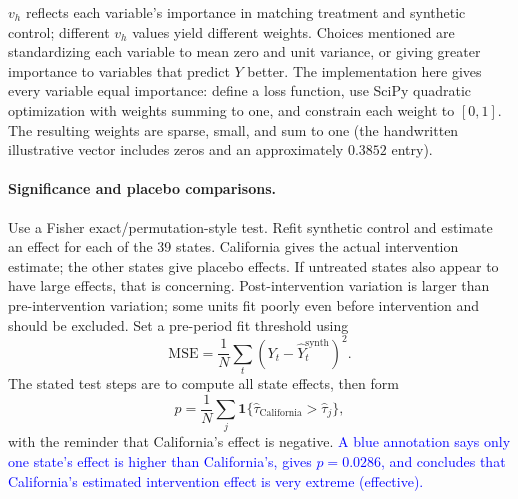 \documentclass[11pt,a4paper]{article}
\newcommand{\inkblue}[1]{\textcolor{blue}{#1}}
\begin{document}
{$v_h$ reflects each variable's importance in matching treatment and synthetic control; different $v_h$ values yield different weights. Choices mentioned are standardizing each variable to mean zero and unit variance, or giving greater importance to variables that predict $Y$ better. The implementation here gives every variable equal importance: define a loss function, use SciPy quadratic optimization with weights summing to one, and constrain each weight to $[0,1]$. The resulting weights are sparse, small, and sum to one (the handwritten illustrative vector includes zeros and an approximately $0.3852$ entry).

\paragraph{Significance and placebo comparisons.}
Use a Fisher exact/permutation-style test. Refit synthetic control and estimate an effect for each of the 39 states. California gives the actual intervention estimate; the other states give placebo effects. If untreated states also appear to have large effects, that is concerning. Post-intervention variation is larger than pre-intervention variation; some units fit poorly even before intervention and should be excluded. Set a pre-period fit threshold using
\[\mathrm{MSE}=\frac1N\sum_t(Y_t-\widehat Y_t^{\mathrm{synth}})^2.\]
The stated test steps are to compute all state effects, then form
\[p=\frac1N\sum_j\mathbf1\{\hat\tau_{\mathrm{California}}>\hat\tau_j\},\]
with the reminder that California's effect is negative. \inkblue{A blue annotation says only one state's effect is higher than California's, gives $p=0.0286$, and concludes that California's estimated intervention effect is very extreme (effective).}

\begin{center}
\end{center}}
\end{document}
